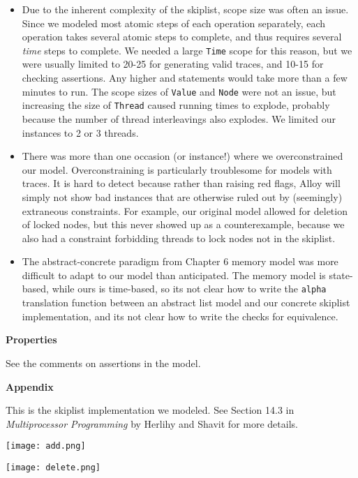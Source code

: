 \documentclass[12pt]{article}
\begin{document}
\begin{itemize}
\item Due to the inherent complexity of the skiplist, scope size was often an issue. Since we modeled most atomic steps of each operation separately, each operation takes several atomic steps to complete, and thus requires several \emph{time} steps to complete. We needed a large \verb|Time| scope for this reason, but we were usually limited to 20-25 for generating valid traces, and 10-15 for checking assertions. Any higher and statements would take more than a few minutes to run. The scope sizes of \verb|Value| and \verb|Node| were not an issue, but increasing the size of \verb|Thread| caused running times to explode, probably because the number of thread interleavings also explodes. We limited our instances to 2 or 3 threads.

\item There was more than one occasion (or instance!) where we overconstrained our model. Overconstraining is particularly troublesome for models with traces. It is hard to detect because rather than raising red flags, Alloy will simply not show bad instances that are otherwise ruled out by (seemingly) extraneous constraints. For example, our original model allowed for deletion of locked nodes, but this never showed up as a counterexample, because we also had a constraint forbidding threads to lock nodes not in the skiplist.

\item The abstract-concrete paradigm from Chapter 6 memory model was more difficult to adapt to our model than anticipated. The memory model is state-based, while ours is time-based, so its not clear how to write the \verb|alpha| translation function between an abstract list model and our concrete skiplist implementation, and its not clear how to write the checks for equivalence.
\end{itemize}

\noindent
\textbf{Properties}

See the comments on assertions in the model.

\noindent
\textbf{Appendix}

This is the skiplist implementation we modeled. See Section 14.3 in \emph{Multiprocessor Programming} by Herlihy and Shavit for more details.

\begin{center}
\texttt{[image: add.png]}
\end{center}

\texttt{[image: delete.png]}
\end{document}
